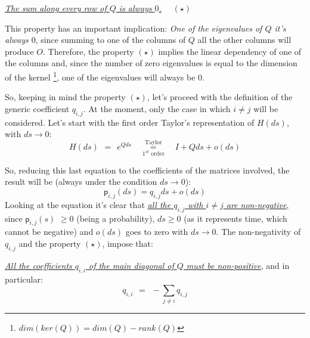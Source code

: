\documentclass[12pt,a4paper]{article}
\newcommand*{\transp}{\mathsf{p}}
\begin{document}
\bigskip\noindent
\underline{\emph{The sum along every row of $Q$ is always $0$.}} $\quad(\star )$

\bigskip\noindent
This property has an important implication: 
\emph{One of the eigenvalues of $Q$ it's always $0$}, since summing to one of the columns of $Q$ all the other columns will produce $O$. Therefore, the property $(\star )$ implies the linear dependency of one of the columns and, since the number of zero eigenvalues is equal to the dimension of the kernel \footnote{$dim(ker(Q))=dim(Q)-rank(Q)$}, one of the eigenvalues will always be $0$.

\bigskip\noindent
So, keeping in mind the property $(\star )$, let's proceed with the definition of the generic coefficient $q_{i,j}$. At the moment, only the case in which $i\neq j$ will be considered. Let's start with the first order Taylor's representation of $H(ds)$, with $ds\rightarrow 0$:
$$
H(ds) \hspace{5pt} =\hspace{5pt}e^{Qds}
\quad
\overset{\textrm{Taylor}}{\underset{1^{st}\textrm{ order}}{=}}
\quad
I+Qds+o(ds)
$$ 

\bigskip\noindent
So, reducing this last equation to the coefficients of the matrices involved, the result will be 
(always under the condition $ds\rightarrow 0$):
$$
\transp_{i,j}(ds)=q_{i,j}ds+o(ds)
$$
Looking at the equation it's clear that \underline{\emph{all the $q_{i,j}$ with $i\neq j$ are non-negative}}, since $\transp_{i,j}(s)$ $\geq 0$ (being a probability), $ds\geq 0$ (as it represents time, which cannot be negative) and $o(ds)$ goes to zero with $ds\rightarrow 0$. 
\newpage
\noindent
The non-negativity of $q_{i,j}$ and the property $(\star )$, impose that:

\bigskip\noindent
\underline{\emph{All the coefficients $q_{i,i}$ of the main diagonal of $Q$ must be non-positive}}, and in particular:
$$
q_{i,i}
\hspace{5pt}=\hspace{5pt}-
\sum_{j\neq i}{q_{i,j}}
$$
\end{document}
